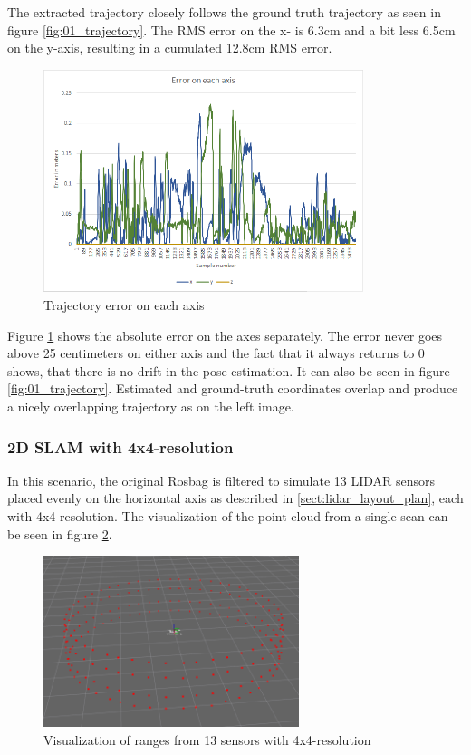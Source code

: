 The extracted trajectory closely follows the ground truth trajectory as seen in figure
\ref{fig:01_trajectory}. The RMS error on the x- is 6.3cm and a bit less 6.5cm on the y-axis,
resulting in a cumulated 12.8cm RMS error.

\begin{figure}[!h]
    \centering
	\includegraphics[height=65mm, keepaspectratio]{figures/01_trajectory_error.png}
    \caption{Trajectory error on each axis}
    \label{fig:01_trajectory_error}
\end{figure}

Figure \ref{fig:01_trajectory_error} shows the absolute error on the axes separately. The error
never goes above 25 centimeters on either axis and the fact that it always returns to 0 shows,
that there is no drift in the pose estimation. It can also be seen in figure
\ref{fig:01_trajectory}. Estimated and ground-truth coordinates overlap and produce a nicely
overlapping trajectory as on the left image.








\subsubsection{2D SLAM with 4x4-resolution}
In this scenario, the original Rosbag is filtered to simulate 13 LIDAR sensors placed
evenly on the horizontal axis as described in \ref{sect:lidar_layout_plan}, each with
4x4-resolution. The visualization of the point cloud from a single scan can be seen in
figure \ref{fig:02_lidar_layout}.

\begin{figure}[!h]
    \centering
	\includegraphics[height=50mm, keepaspectratio]{figures/02_lidar_layout.png}
    \caption{Visualization of ranges from 13 sensors with 4x4-resolution}
    \label{fig:02_lidar_layout}
\end{figure}

